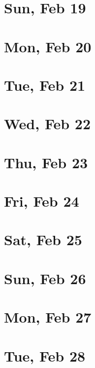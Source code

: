 	\section{Sun, Feb 19}
		
		
	\section{Mon, Feb 20}
		
		
	\section{Tue, Feb 21}
		
		
	\section{Wed, Feb 22}
		
		
	\section{Thu, Feb 23}
		
		
	\section{Fri, Feb 24}
		
		
	\section{Sat, Feb 25}
		
		
	\section{Sun, Feb 26}
		
		
	\section{Mon, Feb 27}
		
		
	\section{Tue, Feb 28}
		
		
